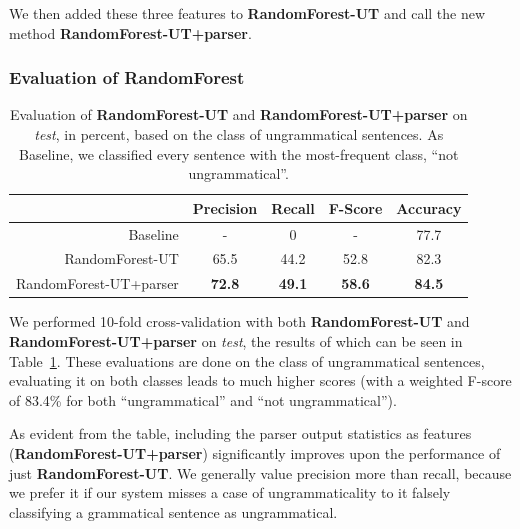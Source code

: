 \documentclass[a4paper,10pt]{scrartcl}
\theoremstyle{style}
\begin{document}
We then added these three features to \textbf{RandomForest-UT} and call the new method \textbf{RandomForest-UT+parser}.

\subsubsection{Evaluation of RandomForest}

\begin{table}
\begin{center}
\begin{tabular}{r|c|c|c|c|}
  & \textbf{Precision} & \textbf{Recall} & \textbf{F-Score} & \textbf{Accuracy}\\
  \hline
  Baseline & - & 0 & - & 77.7\\
  \hline
  RandomForest-UT & 65.5 & 44.2 & 52.8 & 82.3\\
  \hline
  RandomForest-UT+parser & \textbf{72.8} & \textbf{49.1} & \textbf{58.6} & \textbf{84.5}\\
  \hline
  \end{tabular}
\end{center}
\caption{Evaluation of \textbf{RandomForest-UT} and \textbf{RandomForest-UT+parser} on \textit{test}, in percent, based on the class of ungrammatical sentences. As Baseline, we classified every sentence with the most-frequent class, ``not ungrammatical''.}
\label{eval_randomforest}
\end{table}


We performed 10-fold cross-validation with both \textbf{RandomForest-UT} and \textbf{RandomForest-UT+parser} on \textit{test}, the results of which can be seen in Table~\ref{eval_randomforest}. These evaluations are done on the class of ungrammatical sentences, evaluating it on both classes leads to much higher scores (with a weighted F-score of 83.4\% for both ``ungrammatical'' and ``not ungrammatical'').

As evident from the table, including the parser output statistics as features (\textbf{RandomForest-UT+parser}) significantly improves upon the performance of just \textbf{RandomForest-UT}. We generally value precision more than recall, because we prefer it if our system misses a case of ungrammaticality to it falsely classifying a grammatical sentence as ungrammatical.
\end{document}

